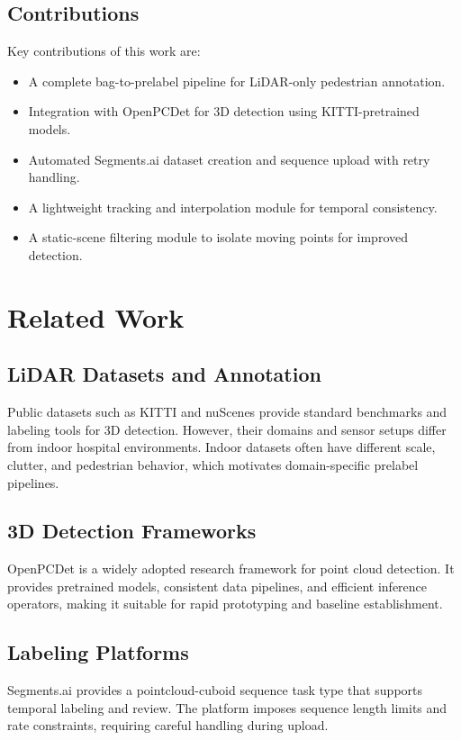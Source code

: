 \documentclass[a4paper,12pt]{report}
\begin{document}
\section{Contributions}
Key contributions of this work are:
\begin{itemize}
\item A complete bag-to-prelabel pipeline for LiDAR-only pedestrian annotation.
\item Integration with OpenPCDet for 3D detection using KITTI-pretrained models.
\item Automated Segments.ai dataset creation and sequence upload with retry handling.
\item A lightweight tracking and interpolation module for temporal consistency.
\item A static-scene filtering module to isolate moving points for improved detection.
\end{itemize}

\chapter{Related Work}
\section{LiDAR Datasets and Annotation}
Public datasets such as KITTI and nuScenes provide standard benchmarks and labeling tools for 3D detection. However, their domains and sensor setups differ from indoor hospital environments. Indoor datasets often have different scale, clutter, and pedestrian behavior, which motivates domain-specific prelabel pipelines.

\section{3D Detection Frameworks}
OpenPCDet is a widely adopted research framework for point cloud detection. It provides pretrained models, consistent data pipelines, and efficient inference operators, making it suitable for rapid prototyping and baseline establishment.

\section{Labeling Platforms}
Segments.ai provides a pointcloud-cuboid sequence task type that supports temporal labeling and review. The platform imposes sequence length limits and rate constraints, requiring careful handling during upload.
\end{document}
